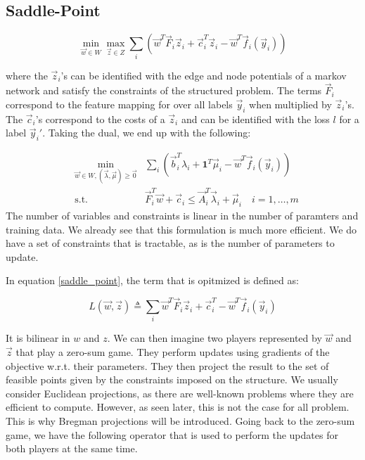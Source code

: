 \subsection{Saddle-Point}
\begin{equation}
  \min_{\vec w \in {W}} \max_{\vec z \in {Z}} \sum_i \left( \vec
w^T \vec F_i \vec z_i + \vec c_i^T \vec z_i - \vec w^T \vec f_i(\vec y_i)
\right)
  \label{saddle_point}
\end{equation}

where the $\vec z_i$'s can be identified with the edge and node potentials of a
markov network and satisfy the constraints of the structured problem. The terms
$\vec F_i$ correspond to the feature mapping for over all labels $\vec y_i$ when
multiplied by $\vec z_i$'s. The $\vec c_i$'s correspond to the costs of a $\vec z_i$ and can be
identified with the loss $l$ for a label $\vec y_i'$. Taking the dual, we end up with
the following:

\begin{equation}
  \begin{aligned}
    &\min_{\vec w \in {W}, (\vec \lambda,\vec \mu) \geq \vec 0} &\sum_i
\left( \vec b_i^T \lambda_i + \mathbf{1}^T \vec \mu_i - \vec w^T \vec f_i(\vec
y_i) \right)\\ &\text{s.t.} &\vec F_i^T \vec w + \vec c_i \leq \vec A_i^T \vec
\lambda_i + \vec \mu_i \quad i=1,\dots,m
  \end{aligned}
\end{equation}
The number of variables and constraints is linear in the number of paramters and
training data. We already see that this formulation is much more efficient. We
do have a set of constraints that is tractable, as is the number of parameters
to update.

In equation \ref{saddle_point}, the term that is opitmized is defined
as:

\begin{equation}
  {L}(\vec w,\vec z) \triangleq \sum_i \vec w^T \vec F_i \vec z_i + \vec
c_i^T - \vec w^T \vec f_i(\vec y_i)
  \label{saddle_obj}
\end{equation}

It is bilinear in $w$ and $z$. We can then imagine two players represented by
$\vec w$ and $\vec z$ that play a zero-sum game. They perform updates using gradients of
the objective w.r.t. their parameters. They then project the result to the set
of feasible points given by the constraints imposed on the structure. We usually
consider Euclidean projections, as there are well-known problems where they are
efficient to compute. However, as seen later, this is not the case for all
problem. This is why Bregman projections will be introduced. Going back to the
zero-sum game, we have the following operator that is used to perform the
updates for both players at the same time.

